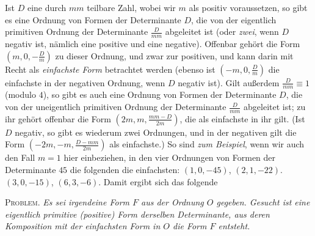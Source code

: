 Ist $D$ eine durch $mm$ teilbare Zahl, wobei wir $m$ als positiv voraussetzen, so gibt es eine Ordnung von Formen der Determinante $D$, die von der eigentlich primitiven Ordnung der Determinante $\frac{D}{mm}$ abgeleitet ist (oder \textit{zwei}, wenn $D$ negativ ist, nämlich eine positive und eine negative). Offenbar gehört die Form $(m,0,-\frac{D}{m})$ zu dieser Ordnung, und zwar zur positiven, und kann darin mit Recht als \textit{einfachste Form} betrachtet werden (ebenso ist $(-m,0,\frac{D}{m})$ die einfachste in der negativen Ordnung, wenn $D$ negativ ist). Gilt außerdem $\frac{D}{mm}\equiv1$ (modulo $4$), so gibt es auch eine Ordnung von Formen der Determinante $D$, die von der uneigentlich primitiven Ordnung der Determinante $\frac{D}{mm}$ abgeleitet ist; zu ihr gehört offenbar die Form $(2m,m,\frac{mm-D}{2m})$, die als einfachste in ihr gilt. (Ist $D$ negativ, so gibt es wiederum zwei Ordnungen, und in der negativen gilt die Form $(-2m,-m,\frac{D-mm}{2m})$ als einfachste.) So sind \textit{zum Beispiel}, wenn wir auch den Fall $m=1$ hier einbeziehen, in den vier Ordnungen
von Formen der Determinante $45$ die folgenden die einfachsten: $(1,0,-45)$, $(2,1,-22)$. $(3,0,-15)$, $(6,3,-6)$. Damit ergibt sich das folgende

\textsc{Problem.} \textit{Es sei irgendeine Form $F$ aus der Ordnung $O$ gegeben. Gesucht ist eine eigentlich primitive (positive) Form derselben Determinante, aus deren Komposition mit der einfachsten Form in $O$ die Form $F$ entsteht.}

